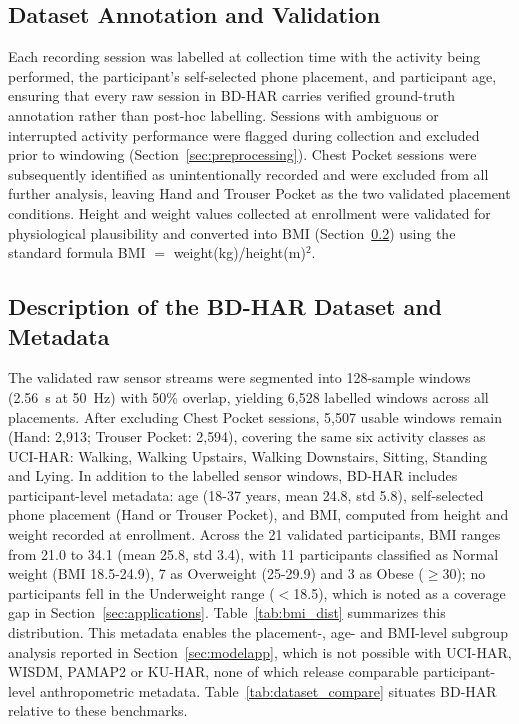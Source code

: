 \documentclass[conference]{IEEEtran}
\begin{document}
\subsection{Dataset Annotation and Validation}
\label{subsec:annotation}
Each recording session was labelled at collection time with the
activity being performed, the participant's self-selected phone
placement, and participant age, ensuring that every raw session in
BD-HAR carries verified ground-truth annotation rather than
post-hoc labelling. Sessions with ambiguous or interrupted activity
performance were flagged during collection and excluded prior to
windowing (Section~\ref{sec:preprocessing}). Chest Pocket sessions
were subsequently identified as unintentionally recorded and were
excluded from all further analysis, leaving Hand and Trouser Pocket as
the two validated placement conditions. Height and weight values
collected at enrollment were validated for physiological plausibility
and converted into BMI (Section~\ref{subsec:description}) using the
standard formula BMI $=$ weight(kg)/height(m)$^2$.

\subsection{Description of the BD-HAR Dataset and Metadata}
\label{subsec:description}
The validated raw sensor streams were segmented into 128-sample
windows (2.56~s at 50~Hz) with 50\% overlap, yielding 6{,}528
labelled windows across all placements. After excluding Chest Pocket
sessions, 5{,}507 usable windows remain (Hand: 2{,}913; Trouser
Pocket: 2{,}594), covering the same six activity classes as UCI-HAR:
Walking, Walking Upstairs, Walking Downstairs, Sitting, Standing and
Lying. In addition to the labelled sensor windows, BD-HAR includes
participant-level metadata: age (18-37 years, mean 24.8, std 5.8),
self-selected phone placement (Hand or Trouser Pocket), and BMI,
computed from height and weight recorded at enrollment. Across the 21
validated participants, BMI ranges from 21.0 to 34.1 (mean 25.8, std
3.4), with 11 participants classified as Normal weight (BMI
18.5-24.9), 7 as Overweight (25-29.9) and 3 as Obese ($\geq$30);
no participants fell in the Underweight range ($<$18.5), which is
noted as a coverage gap in Section~\ref{sec:applications}.
Table~\ref{tab:bmi_dist} summarizes this distribution. This metadata
enables the placement-, age- and BMI-level subgroup analysis reported
in Section~\ref{sec:modelapp}, which is not possible with UCI-HAR,
WISDM, PAMAP2 or KU-HAR, none of which release comparable
participant-level anthropometric metadata. Table~\ref{tab:dataset_compare} situates BD-HAR relative to these benchmarks.
\end{document}
